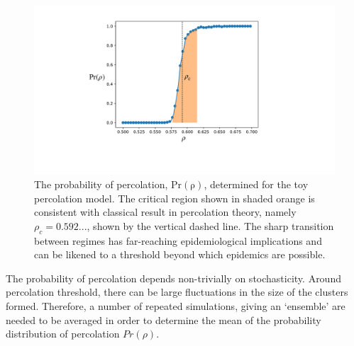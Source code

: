 \begin{figure}
    \centering
    \includegraphics[scale=0.25]{chapter3/figures/figure2.pdf}
    \caption{The probability of percolation, $\mathrm{Pr(\rho)}$, determined for the toy percolation model. The critical region shown in shaded orange is consistent with classical result in percolation theory, namely $\rho_c = 0.592...$, shown by the vertical dashed line. The sharp transition between regimes has far-reaching epidemiological implications and can be likened to a threshold beyond which epidemics are possible.}
    \label{fig:ch3-perc-pr}
\end{figure}

The probability of percolation depends non-trivially on stochasticity. %
Around percolation threshold, there can be large fluctuations in the size of the clusters formed. %
Therefore, a number of repeated simulations, giving an `ensemble' \cite{gibbs1902elementary} are %
needed to be averaged in order to determine the mean of the probability distribution of percolation $Pr(\rho)$.

